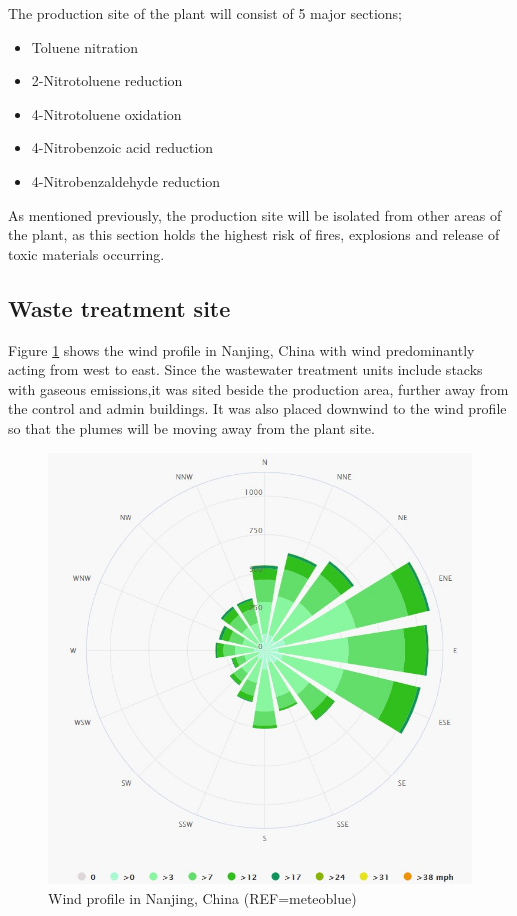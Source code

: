 The production site of the plant will consist of 5 major sections; 

\begin{itemize}
    \item Toluene nitration
    \item 2-Nitrotoluene reduction 
    \item 4-Nitrotoluene oxidation 
    \item 4-Nitrobenzoic acid reduction 
    \item 4-Nitrobenzaldehyde reduction 
\end{itemize}

As mentioned previously, the production site will be isolated from other areas of the plant, as this section holds the highest risk of fires, explosions  and release of toxic materials occurring. 

\subsection{Waste treatment site}

Figure \ref{fig:wind} shows the wind profile in Nanjing, China with wind predominantly acting from west to east. Since the wastewater treatment units include stacks with gaseous emissions,it was sited beside the production area, further away from the control and admin buildings. It was also placed downwind to the wind profile so that the plumes will be moving away from the plant site. 
\begin{figure}
\centering
\includegraphics[width=\linewidth]{chapters/5-safety-layout-environment/figures/Windrose profile.jpg}
\caption{Wind profile in Nanjing, China (REF=meteoblue)}
\label{fig:wind}
\end{figure}

